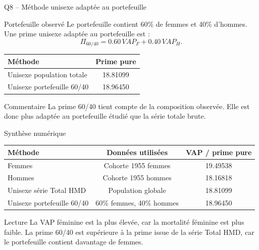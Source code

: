 \documentclass[11pt,aspectratio=169]{beamer}
\begin{document}
\begin{frame}{Q8 -- Méthode unisexe adaptée au portefeuille}
  \begin{block}{Portefeuille observé}
    Le portefeuille contient 60\% de femmes et 40\% d'hommes. Une prime unisexe adaptée au portefeuille est :
    \[
      \Pi_{60/40}=0.60\,VAP_F+0.40\,VAP_H.
    \]
  \end{block}

  \vspace{0.12cm}
  \begin{center}
  \begin{tabular}{lc}
    \toprule
    Méthode & Prime pure \\
    \midrule
    Unisexe population totale & 18.81099 \\
    Unisexe portefeuille 60/40 & 18.96450 \\
    \bottomrule
  \end{tabular}
  \end{center}

  \vspace{0.08cm}
  \begin{block}{Commentaire}
    La prime 60/40 tient compte de la composition observée. Elle est donc plus adaptée au portefeuille étudié que la série totale brute.
  \end{block}
\end{frame}

\begin{frame}{Synthèse numérique}
  \vspace{0.25cm}
  \begin{center}
  \renewcommand{\arraystretch}{1.35}
  \begin{tabular}{lcc}
    \toprule
    Méthode & Données utilisées & VAP / prime pure \\
    \midrule
    Femmes & Cohorte 1955 femmes & 19.49538 \\
    Hommes & Cohorte 1955 hommes & 18.16818 \\
    Unisexe série Total HMD & Population globale & 18.81099 \\
    Unisexe portefeuille 60/40 & 60\% femmes, 40\% hommes & 18.96450 \\
    \bottomrule
  \end{tabular}
  \end{center}

  \vspace{0.45cm}
  \begin{block}{Lecture}
    La VAP féminine est la plus élevée, car la mortalité féminine est plus faible. La prime 60/40 est supérieure à la prime issue de la série Total HMD, car le portefeuille contient davantage de femmes.
  \end{block}
\end{frame}
\end{document}
